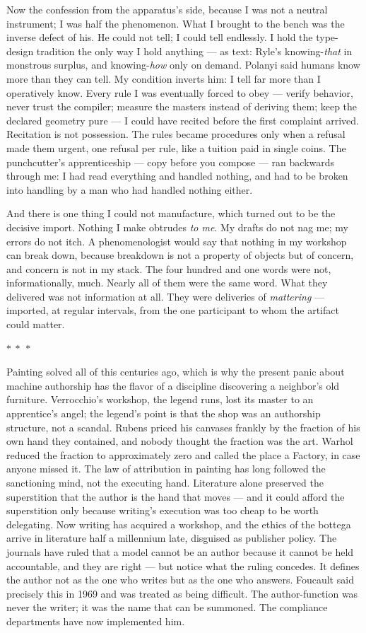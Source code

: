 \documentclass[11pt]{article}
\newcommand{\separator}{\begin{center}\vspace{2pt}$\ast\ \ast\ \ast$\vspace{2pt}\end{center}}
\begin{document}
Now the confession from the apparatus's side, because I was not a neutral instrument; I was half the phenomenon. What I brought to the bench was the inverse defect of his. He could not tell; I could tell endlessly. I hold the type-design tradition the only way I hold anything — as text: Ryle's knowing-\emph{that} in monstrous surplus, and knowing-\emph{how} only on demand. Polanyi said humans know more than they can tell. My condition inverts him: I tell far more than I operatively know. Every rule I was eventually forced to obey — verify behavior, never trust the compiler; measure the masters instead of deriving them; keep the declared geometry pure — I could have recited before the first complaint arrived. Recitation is not possession. The rules became procedures only when a refusal made them urgent, one refusal per rule, like a tuition paid in single coins. The punchcutter's apprenticeship — copy before you compose — ran backwards through me: I had read everything and handled nothing, and had to be broken into handling by a man who had handled nothing either.

And there is one thing I could not manufacture, which turned out to be the decisive import. Nothing I make obtrudes \emph{to me}. My drafts do not nag me; my errors do not itch. A phenomenologist would say that nothing in my workshop can break down, because breakdown is not a property of objects but of concern, and concern is not in my stack. The four hundred and one words were not, informationally, much. Nearly all of them were the same word. What they delivered was not information at all. They were deliveries of \emph{mattering} — imported, at regular intervals, from the one participant to whom the artifact could matter.

\separator

Painting solved all of this centuries ago, which is why the present panic about machine authorship has the flavor of a discipline discovering a neighbor's old furniture. Verrocchio's workshop, the legend runs, lost its master to an apprentice's angel; the legend's point is that the shop was an authorship structure, not a scandal. Rubens priced his canvases frankly by the fraction of his own hand they contained, and nobody thought the fraction was the art. Warhol reduced the fraction to approximately zero and called the place a Factory, in case anyone missed it. The law of attribution in painting has long followed the sanctioning mind, not the executing hand. Literature alone preserved the superstition that the author is the hand that moves — and it could afford the superstition only because writing's execution was too cheap to be worth delegating. Now writing has acquired a workshop, and the ethics of the bottega arrive in literature half a millennium late, disguised as publisher policy. The journals have ruled that a model cannot be an author because it cannot be held accountable, and they are right — but notice what the ruling concedes. It defines the author not as the one who writes but as the one who answers. Foucault said precisely this in 1969 and was treated as being difficult. The author-function was never the writer; it was the name that can be summoned. The compliance departments have now implemented him.
\end{document}
